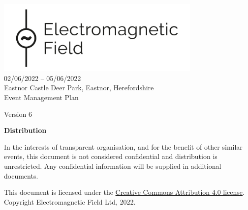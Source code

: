 

\newcommand{\st}{\textsuperscript{st} }
\newcommand{\nd}{\textsuperscript{nd} }
\renewcommand{\th}{\textsuperscript{th} }
\newcommand{\rd}{\textsuperscript{rd} }
\newcommand{\sq}{\textsuperscript{2}}




\begin{titlepage}
\thispagestyle{empty}
\begin{center}
    \includegraphics[width=10cm]{../resources/emf-logo.png}\\[24pt]
    {\LARGE 02/06/2022 -- 05/06/2022} \\[16pt]
    {\Large Eastnor Castle Deer Park, Eastnor, Herefordshire} \\[48pt]

    {\Large Event Management Plan}

    Version 6

    \vfill

    \begin{framed}
        \textbf{Distribution}

        In the interests of transparent organisation, and for the benefit of other similar events,
        this document is not considered confidential and distribution is unrestricted.
        Any confidential information will be supplied in additional documents.
        
        \footnotesize{This document is licensed under the
        \href{https://creativecommons.org/licenses/by/4.0/}{Creative Commons Attribution 4.0 license}.
	Copyright Electromagnetic Field Ltd, 2022.}
    \end{framed}


\end{center}
\end{titlepage}
